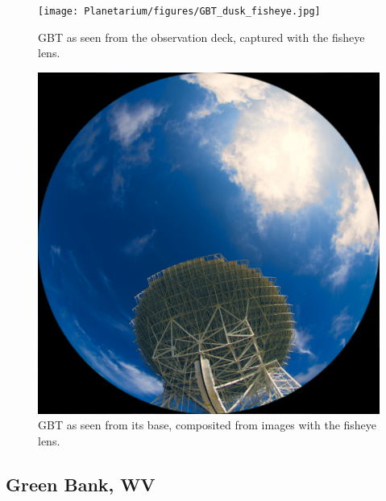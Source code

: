 \begin{figure}[htb]
\centering
\begin{minipage}[b]{0.48\textwidth}
\centering
\texttt{[image: Planetarium/figures/GBT\_dusk\_fisheye.jpg]}
\caption{GBT as seen from the observation deck, captured with the fisheye lens.}
\label{Fig:GBT_dusk_fisheye}
\end{minipage}%
\begin{minipage}[b]{0.02\textwidth}
\hspace{1cm}
\end{minipage}%
\begin{minipage}[b]{0.48\textwidth}
\centering
\includegraphics[width=0.95\linewidth]{Planetarium/figures/GBT_base_render.jpg}
\caption{GBT as seen from its base, composited from images with the fisheye lens.}
\label{Fig:GBT_base_fisheye}
\end{minipage}
\end{figure}


\subsection{Green Bank, WV}

